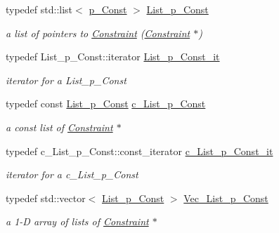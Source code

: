 \begin{DoxyCompactItemize}
typedef std\+::list$<$ \mbox{\hyperlink{group___constraint___t_y_p_e_s_gae2abae1fd3e9370e1c0cc9dfbb4d6718}{p\+\_\+\+Const}} $>$ \mbox{\hyperlink{group___constraint___t_y_p_e_s_gaa56320d40c626389a8a4ce4b5a4fb0a8}{List\+\_\+p\+\_\+\+Const}}
\begin{DoxyCompactList}\small\item\em a list of pointers to \mbox{\hyperlink{class_s_m_spp__di__unipi__it_1_1_constraint}{Constraint}} (\mbox{\hyperlink{class_s_m_spp__di__unipi__it_1_1_constraint}{Constraint}} $\ast$) \end{DoxyCompactList}\item 
typedef List\+\_\+p\+\_\+\+Const\+::iterator \mbox{\hyperlink{group___constraint___t_y_p_e_s_gae9df1eca77351c69dda87903069d31f9}{List\+\_\+p\+\_\+\+Const\+\_\+it}}
\begin{DoxyCompactList}\small\item\em iterator for a List\+\_\+p\+\_\+\+Const \end{DoxyCompactList}\item 
typedef const \mbox{\hyperlink{group___constraint___t_y_p_e_s_gaa56320d40c626389a8a4ce4b5a4fb0a8}{List\+\_\+p\+\_\+\+Const}} \mbox{\hyperlink{group___constraint___t_y_p_e_s_ga6279fed2d96abe5a21abdb8236050f07}{c\+\_\+\+List\+\_\+p\+\_\+\+Const}}
\begin{DoxyCompactList}\small\item\em a const list of \mbox{\hyperlink{class_s_m_spp__di__unipi__it_1_1_constraint}{Constraint}} $\ast$ \end{DoxyCompactList}\item 
typedef c\+\_\+\+List\+\_\+p\+\_\+\+Const\+::const\+\_\+iterator \mbox{\hyperlink{group___constraint___t_y_p_e_s_ga79d1198390aff9a22574ada53e7d161a}{c\+\_\+\+List\+\_\+p\+\_\+\+Const\+\_\+it}}
\begin{DoxyCompactList}\small\item\em iterator for a c\+\_\+\+List\+\_\+p\+\_\+\+Const \end{DoxyCompactList}\item 
typedef std\+::vector$<$ \mbox{\hyperlink{group___constraint___t_y_p_e_s_gaa56320d40c626389a8a4ce4b5a4fb0a8}{List\+\_\+p\+\_\+\+Const}} $>$ \mbox{\hyperlink{group___constraint___t_y_p_e_s_gaa409095a6d6a88da1046314c1752d89d}{Vec\+\_\+\+List\+\_\+p\+\_\+\+Const}}
\begin{DoxyCompactList}\small\item\em a 1-\/D array of lists of \mbox{\hyperlink{class_s_m_spp__di__unipi__it_1_1_constraint}{Constraint}} $\ast$ \end{DoxyCompactList}\item 

\end{DoxyCompactItemize}
